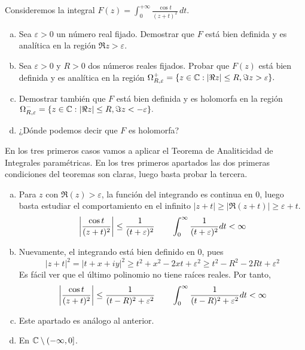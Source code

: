 \documentclass[twoside]{article}
\begin{document}
\newpage
\begin{ejercicio}{3}
Consideremos la integral 
$\displaystyle{F(z)=\int_0^{+\infty}\frac{\cos t}{(z+t)^2}\,dt}$.
\begin{enumerate}[a)]
\item Sea $\varepsilon>0$ un número real fijado. Demostrar que $F$  está bien definida y es analítica en la región $\Re z>\varepsilon$.
\item Sea $\varepsilon>0$ y $R>0$ dos números reales fijados. Probar que $F(z)$ está bien definida y es analítica en la región $\Omega^+_{R,\varepsilon}=\{z\in\mathbb{C}: |\Re z|\le R, \Im z>\varepsilon\}.$
\item Demostrar también que $F$ está bien definida y es holomorfa en la región\newline 
$\Omega^-_{R,\varepsilon}=\{z\in\mathbb{C}: |\Re z|\le R, \Im z<-\varepsilon\}.$
\item ¿Dónde podemos decir que $F$ es holomorfa?
\end{enumerate}
\end{ejercicio}
\begin{solucion}
En los tres primeros casos vamos a aplicar el Teorema de Analiticidad de Integrales paramétricas. En los tres primeros apartados las dos primeras condiciones del teoremas son claras, luego basta probar la tercera.
\begin{enumerate}[a)]
\item Para $z$ con $\Re(z)>\varepsilon$, la función del integrando es continua en 0, luego basta estudiar el comportamiento en el infinito $|z+t| \geq |\Re(z+t)| \geq \varepsilon+t$. 
$$
\left\lvert\frac{\cos t}{(z+t)^2}\right\rvert \leq \frac{1}{(t+\varepsilon)^2} \qquad \int_0^\infty \frac{1}{(t+\varepsilon)^2} dt < \infty
$$
\item Nuevamente, el integrando está bien definido en $0$, pues $$|z+t|^2 = |t+x + iy|^2 \geq t^2+x^2-2xt + \varepsilon^2 \geq t^2 - R^2-2Rt + \varepsilon^2$$
Es fácil ver que el último polinomio no tiene raíces reales. Por tanto,
$$
\left\lvert\frac{\cos t}{(z+t)^2}\right\rvert \leq \frac{1}{(t-R)^2+\varepsilon^2} \qquad \int_0^\infty \frac{1}{(t-R)^2+\varepsilon^2} dt < \infty
$$
\item Este apartado es análogo al anterior.
\item En $\mathbb{C}\setminus (-\infty,0]$.
\end{enumerate}
\end{solucion}
\end{document}
